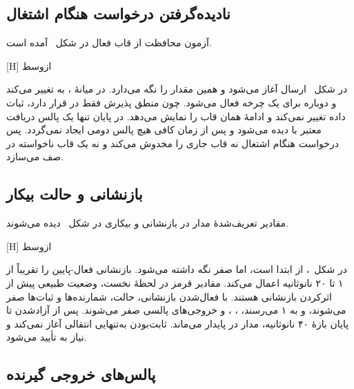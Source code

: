 \subsection{نادیده‌گرفتن درخواست هنگام اشتغال}

آزمون محافظت از قاب فعال در شکل~ آمده است.

[H]
‌ازوسط

در شکل~ ارسال  آغاز می‌شود و
 همین مقدار را نگه می‌دارد. در میانهٔ ،
 به  تغییر می‌کند و  دوباره برای یک چرخه فعال
می‌شود. چون منطق پذیرش فقط در  قرار دارد، ثبات داده تغییر نمی‌کند و 
ادامهٔ همان قاب  را نمایش می‌دهد. در پایان تنها یک پالس دریافت معتبر با
 دیده می‌شود و پس از زمان کافی هیچ پالس دومی ایجاد نمی‌گردد. پس
درخواست هنگام اشتغال نه قاب جاری را مخدوش می‌کند و نه یک قاب ناخواسته در صف می‌سازد.


\subsection{بازنشانی و حالت بیکار}

مقادیر تعریف‌شدهٔ مدار در بازنشانی و بیکاری در شکل~ دیده
می‌شوند.

[H]
‌ازوسط

در شکل~،  از ابتدا  است، اما
 صفر نگه داشته می‌شود.  بازنشانی فعال-پایین را تقریباً از ۱ تا
۲۰ نانوثانیه اعمال می‌کند. مقادیر قرمز  در لحظهٔ نخست، وضعیت طبیعی پیش از
اثرکردن بازنشانی هستند. با فعال‌شدن بازنشانی، حالت، شمارنده‌ها و ثبات‌ها صفر می‌شوند،
 و  به ۱ می‌رسند، ، ،
 و خروجی‌های پالسی صفر می‌شوند. پس از آزادشدن  تا پایان بازهٔ
۴۰ نانوثانیه، مدار در  پایدار می‌ماند. ثابت‌بودن  به‌تنهایی
انتقالی آغاز نمی‌کند و نیاز به  تأیید می‌شود.


\subsection{پالس‌های خروجی گیرنده}

